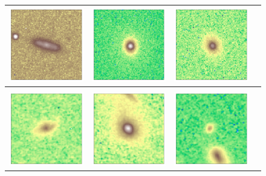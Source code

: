 \documentclass[twocolumn]{aastex63}
\begin{document}
\begin{figure}[htbp]
\begin{center}
\begin{tabular}{cccc}
     \includegraphics[width=3.25cm,height=3.25cm]{587722983369408606.pdf} & \includegraphics[width=3.25cm,height=3.25cm]{587724198278725806.pdf} & \includegraphics[width=3.25cm,height=3.25cm]{587724232641937529.pdf}
     &
     \\[0.3cm]
     \hline
     \\
      \includegraphics[width=3.25cm,height=3.25cm]{goodsn_93.pdf} & \includegraphics[width=3.25cm,height=3.25cm]{goodsn_750.pdf} & \includegraphics[width=3.25cm,height=3.25cm]{goodsn_88.pdf} &

\end{tabular}
\end{center}
\end{figure}
\end{document}
